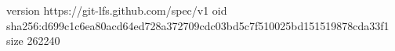version https://git-lfs.github.com/spec/v1
oid sha256:d699c1c6ea80acd64ed728a372709cdc03bd5c7f510025bd151519878cda33f1
size 262240
